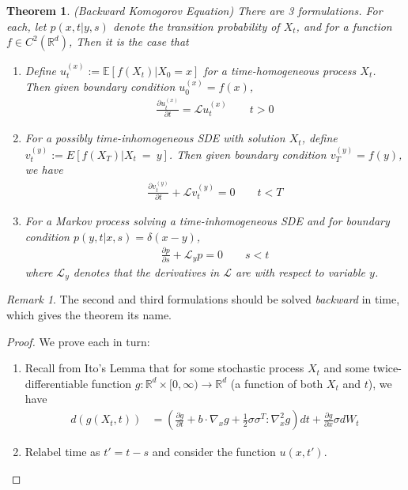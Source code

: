 \documentclass[12pt]{article}
\theoremstyle{plain}
\newtheorem{thm}{Theorem}[section]
\theoremstyle{definition}
\theoremstyle{remark}
\newtheorem*{rmk}{Remark}
\begin{document}
\begin{thm}{\emph{(Backward Komogorov Equation)}}
There are 3 formulations. For each, let $p(x,t|y,s)$ denote the
transition probability of $X_t$, and for a function $f\in
C^2(\mathbb{R}^d)$, Then it is the case that
\begin{enumerate}
  \item Define $u_t^{(x)} := \mathbb{E}[f(X_t)|X_0=x]$ for a
    time-homogeneous process $X_t$. Then given boundary condition
    $u^{(x)}_0=f(x)$,
    \begin{align*}
      \frac{\partial u^{(x)}_t}{\partial t} = \mathscr{L} u^{(x)}_t
      \qquad t>0
    \end{align*}
  \item For a possibly time-inhomogeneous SDE with solution $X_t$,
    define $v^{(y)}_t:=E[f(X_T)|X_t~=~y]$. Then given boundary
    condition $v^{(y)}_T=f(y)$, we have
    \begin{align*}
      \frac{\partial v^{(y)}_t}{\partial t}
      + \mathscr{L} v^{(y)}_t = 0
      \qquad t < T
    \end{align*}
  \item For a Markov process solving a time-inhomogeneous SDE
    and for boundary condition $p(y,t|x,s) = \delta(x-y)$,
    \begin{align*}
      \frac{\partial p}{\partial s} + \mathscr{L}_y p = 0
      \qquad s<t
    \end{align*}
    where $\mathscr{L}_y$ denotes that the derivatives in $\mathscr{L}$
    are with respect to variable $y$.
\end{enumerate}
\end{thm}
\begin{rmk}
The second and third formulations should be solved \emph{backward} in
time, which gives the theorem its name.
\end{rmk}
\begin{proof}
We prove each in turn:
  \begin{enumerate}
    \item Recall from Ito's Lemma that for some stochastic process $X_t$
      and some twice-differentiable function $g: \mathbb{R}^d \times
      [0,\infty) \rightarrow \mathbb{R}^d$ (a function of both $X_t$ and
      $t$), we have
      \begin{align*}
        d\left(g(X_t,t)\right)
        &=
        \left(
        \frac{\partial g}{\partial t}
        + b \cdot \nabla_x g
        + \frac{1}{2} \sigma \sigma^T : \nabla_x^2 g
        \right)dt
        +
        \frac{\partial g}{\partial x} \sigma dW_t
      \end{align*}
    \item Relabel time as $t' = t-s$ and consider the function
      $u(x,t')$.
  \end{enumerate}
\end{proof}
\end{document}
